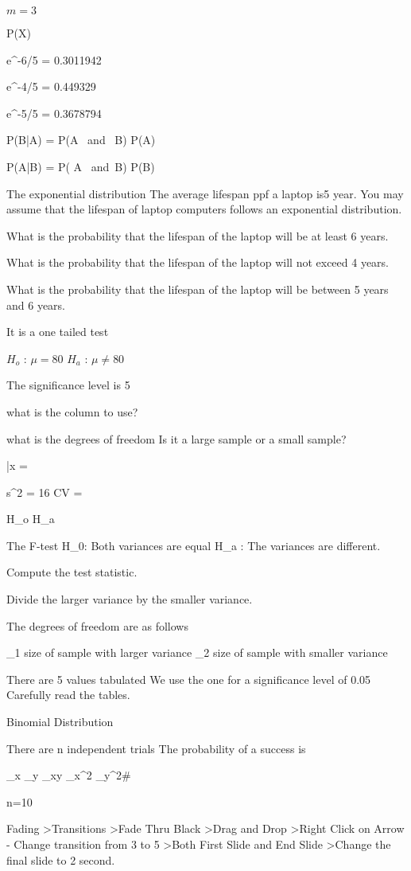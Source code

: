 $m=3$


P(X)


e^{-6/5} = 0.3011942

e^{-4/5} = 0.449329

e^{-5/5} = 0.3678794


P(B|A) = { P(A \mbox{ and } B) \over P(A) }
 
P(A|B) = { P( A \mbox{ and }B) \over P(B) }






The exponential distribution
The average lifespan ppf a laptop is5 year. You may assume that the lifespan of laptop computers follows an exponential distribution.

What is the probability that the lifespan of the laptop will be at least 6 years.

What is the probability that the lifespan of the laptop will not exceed 4 years.

What is the probability that the lifespan of the laptop will be between 5 years and 6 years.



It is a one tailed test

$H_o$  : $\mu = 80 $
$H_a$  : $\mu \neq 80$ 

The significance level is 5%

what is the column to use?

what is the degrees of freedom 
Is it a large sample or a small sample?


\bar{x} = 

s^2 = 16
CV = 








H_o
H_a

The F-test
H_0: Both variances are equal
H_a : The variances are different.

Compute the test statistic.

Divide the larger variance by the smaller variance.

The degrees of freedom are as follows
 
\nu_1 size of sample with larger variance
\nu_2 size of sample with smaller variance


There are 5 values tabulated
We use the one for a significance level of 0.05
Carefully read the tables.


Binomial Distribution

There are n independent trials
The probability of a success is

\sum_x
\sum_y
\sum_xy
\sum_x^2
\sum_y^2#

n=10






Fading
>Transitions
>Fade Thru Black
>Drag and Drop
>Right Click on Arrow - Change transition from 3 to 5
>Both First Slide and End Slide
>Change the final slide to 2 second.
